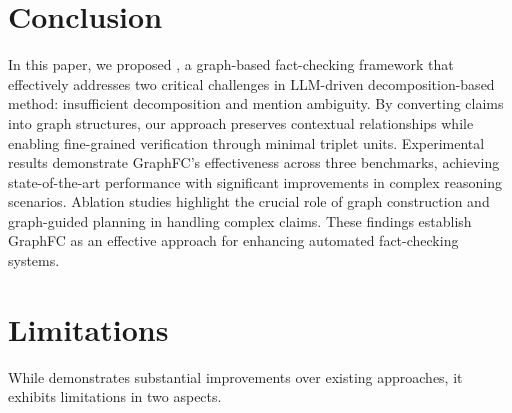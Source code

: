 \section{Conclusion}
In this paper, we proposed {\MyFC}, a graph-based fact-checking framework that effectively addresses two critical challenges in LLM-driven decomposition-based method: insufficient decomposition and mention ambiguity. By converting claims into graph structures, our approach preserves contextual relationships while enabling fine-grained verification through minimal triplet units. Experimental results demonstrate GraphFC's effectiveness across three benchmarks, achieving state-of-the-art performance with significant improvements in complex reasoning scenarios. Ablation studies highlight the crucial role of graph construction and graph-guided planning in handling complex claims. These findings establish GraphFC as an effective approach for enhancing automated fact-checking systems.

\section*{Limitations}
While {\MyFC} demonstrates substantial improvements over existing approaches, it exhibits limitations in two aspects. 

